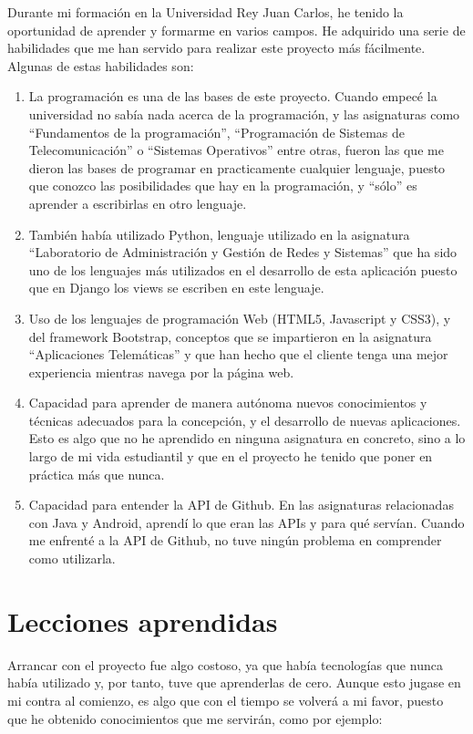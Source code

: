 \documentclass[a4paper, 12pt]{book}
\begin{document}
Durante mi formación en la Universidad Rey Juan Carlos, he tenido la oportunidad de aprender y formarme en varios campos. He adquirido una serie de habilidades que me han servido para realizar este proyecto más fácilmente. Algunas de estas habilidades son:
\begin{enumerate}
  \item La programación es una de las bases de este proyecto. Cuando empecé la universidad no sabía nada acerca de la programación, y las asignaturas como ``Fundamentos de la programación'', ``Programación de Sistemas de Telecomunicación'' o ``Sistemas Operativos'' entre otras, fueron las que me dieron las bases de programar en practicamente cualquier lenguaje, puesto que conozco las posibilidades que hay en la programación, y ``sólo'' es aprender a escribirlas en otro lenguaje.
  \item También había utilizado Python, lenguaje utilizado en la asignatura ``Laboratorio de Administración y Gestión de Redes y Sistemas'' que ha sido uno de los lenguajes más utilizados en el desarrollo de esta aplicación puesto que en Django los views se escriben en este lenguaje.
  \item Uso de los lenguajes de programación Web (HTML5, Javascript y CSS3), y del framework Bootstrap, conceptos que se impartieron en la asignatura ``Aplicaciones Telemáticas'' y que han hecho que el cliente tenga una mejor experiencia mientras navega por la página web.
  \item Capacidad para aprender de manera autónoma nuevos conocimientos y técnicas adecuados para la concepción, y el desarrollo de nuevas aplicaciones. Esto es algo que no he aprendido en ninguna asignatura en concreto, sino a lo largo de mi vida estudiantil y que en el proyecto he tenido que poner en práctica más que nunca.
  \item Capacidad para entender la API de Github. En las asignaturas relacionadas con Java y Android, aprendí lo que eran las APIs y para qué servían. Cuando me enfrenté a la API de Github, no tuve ningún problema en comprender como utilizarla.
\end{enumerate}


\section{Lecciones aprendidas}
\label{sec:lecciones_aprendidas}
Arrancar con el proyecto fue algo costoso, ya que había tecnologías que nunca había utilizado y, por tanto, tuve que aprenderlas de cero. Aunque esto jugase en mi contra al comienzo, es algo que con el tiempo se volverá a mi favor, puesto que he obtenido conocimientos que me servirán, como por ejemplo:
\end{document}
